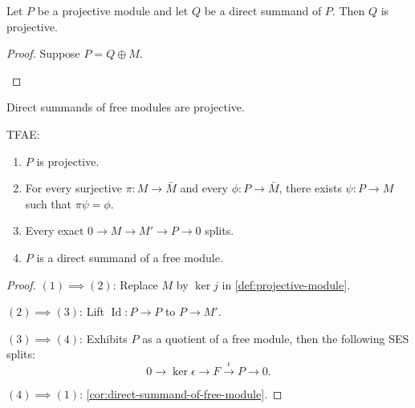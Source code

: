 \begin{lemma}
    \label{lem:direct-summand-of-projective-module}
    Let \(P\) be a projective module and let \(Q\) be a direct summand of \(P\). Then \(Q\) is projective.
\end{lemma}
\begin{proof} Suppose \(P=Q\oplus M\). 
\begin{center} 
\end{center}
\end{proof}

\begin{corollary}
    \label{cor:direct-summand-of-free-module}
    Direct summands of free modules are projective.
\end{corollary}

\begin{proposition}
    \label{prop:characterization-of-projctive-module}
    TFAE:
    \begin{enumerate}
        \item \(P\) is projective.
        \item For every surjective  \(\pi:M\to \bar M\) and every \(\phi:P\to \bar M\), there exists \(\psi :P\to M\) such that \(\pi\psi = \phi\).
        \item Every exact \(0\to M\to M'\to P \to 0\) splits.
        \item \(P\) is a direct summand of a free module.
    \end{enumerate}
\end{proposition}
\begin{proof}
    \((1) \implies (2)\): Replace \(M\) by \(\ker j\) in \cref{def:projective-module}.

    \((2) \implies (3)\): Lift \(\operatorname{Id}:P\to P\) to \(P\to M'\).

    \((3) \implies (4)\): Exhibits \(P\) as a quotient of a free module, then the following SES splits: 
    \[0 \to \ker \epsilon \to F \xrightarrow{\epsilon} P \to 0.\]

    \((4) \implies (1)\): \cref{cor:direct-summand-of-free-module}.
\end{proof}

